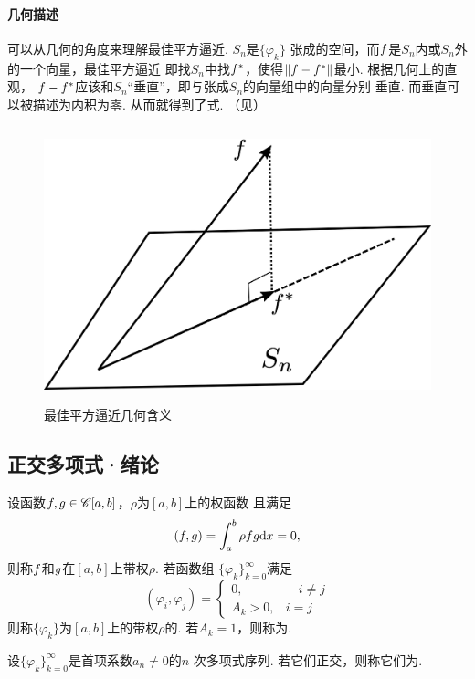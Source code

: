   \paragraph{几何描述}
    可以从几何的角度来理解最佳平方逼近. $S_n$是$\{\varphi_k\}$
    张成的空间，而$\mathnormal{f}$是$S_n$内或$S_n$外的一个向量，最佳平方逼近
    即找$S_n$中找$\mathnormal{f}^*$，使得$\|\mathnormal{f}-\mathnormal{f}^*\|$最小. 根据几何上的直观，
    $\mathnormal{f}-\mathnormal{f}^*$应该和$S_n$“垂直”，即与张成$S_n$的向量组中的向量分别
    垂直. 而垂直可以被描述为内积为零. 从而就得到了式.
    （见）
    \begin{figure}[htbp]
      \centering
      \includegraphics[height=8cm]{../image/least-square.png}
      \caption{最佳平方逼近几何含义}
      \label{fig: 最佳平方逼近几何含义}
    \end{figure}

\newpage
\subsection{正交多项式·绪论}
  \begin{defi}[正交]
    设函数$\mathnormal{f},\mathnormal{g}\in\mathscr{C}[a, b]$，$\rho$为$[a, b]$上的权函数
    且满足
    \[
      (\mathnormal{f}, \mathnormal{g}) = \int_a^b\rho\mathnormal{f}\mathnormal{g}\mathrm{d} x = 0,
    \]
    则称$\mathnormal{f}$和$\mathnormal{g}$在$[a, b]$上带权$\rho$. 若函数组
    $\{\varphi_k\}_{k=0}^\infty$满足
    \[
      (\varphi_i,\varphi_j) =
      \begin{cases}
        0,&\quad i\ne j \\
        A_k>0,& i=j
      \end{cases}
    \]
    则称$\{\varphi_k\}$为$[a, b]$上的带权$\rho$的.
    若$A_k=1$，则称为.
  \end{defi}

  \begin{defi}[正交多项式]
    设$\{\varphi_k\}_{k=0}^\infty$是首项系数$a_n\ne0$的$n$
    次多项式序列. 若它们正交，则称它们为.
  \end{defi}

